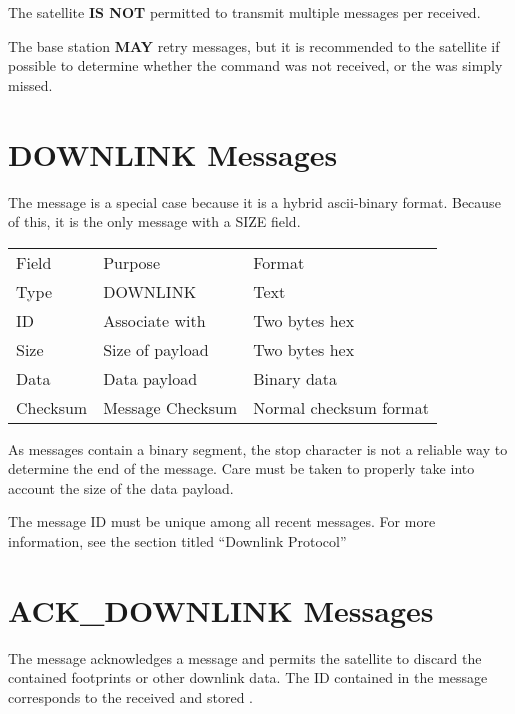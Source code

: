 \documentclass{article}
\begin{document}
  The satellite \textbf{IS NOT} permitted to transmit multiple \macommand messages per \mcommand received.
  
  The base station \textbf{MAY} retry \mcommand messages, but it is recommended to \mquery the satellite
  if possible to determine whether the command was not received, or the \macommand was simply missed.
  
\pagebreak
\section{DOWNLINK Messages}
  The \mdownlink message is a special case because it is a hybrid ascii-binary 
  format. Because of this, it is the only message with a SIZE field.
  
  \begin{center}
  \begin{tabular}{| l | l | l |}
   \hline
  	Field & Purpose & Format \\
  	Type & DOWNLINK & Text \\
  	ID & Associate \mdownlink with \madownlink & Two bytes hex \\
  	Size & Size of payload & Two bytes hex \\
  	Data & Data payload & Binary data \\
  	Checksum & Message Checksum & Normal checksum format \\
   \hline
  \end{tabular}
  \end{center}
  	
  As \mdownlink messages contain a binary segment, the stop character is not
  a reliable way to determine the end of the message. Care must be taken to 
  properly take into account the size of the data payload.
 
  The message ID must be unique among all recent messages. For more
  information, see the section titled ``Downlink Protocol''
  
  
  \pagebreak[0]
\section{ACK\_DOWNLINK Messages}
	The \madownlink message acknowledges a \mdownlink message and permits the
	satellite to discard the contained footprints or other downlink data. The 
	ID contained in the \madownlink message corresponds to the received and
	stored \mdownlink.
	
\end{document}
